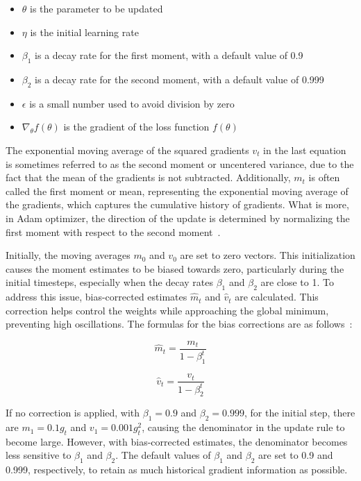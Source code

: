 \documentclass[12pt,a4paper]{report}
\begin{document}
\begin{itemize}
  \item \(\theta\) is the parameter to be updated
  \item \(\eta\) is the initial learning rate
  \item \(\beta_1\) is a decay rate for the first moment, with a default value of 0.9
  \item \(\beta_2\) is a decay rate for the second moment, with a default value of 0.999
  \item \(\epsilon\) is a small number used to avoid division by zero
  \item \(\nabla_\theta f(\theta)\) is the gradient of the loss function \(f(\theta)\)
\end{itemize}

The exponential moving average of the squared gradients \( v_t \) in the last equation is sometimes referred to as the second moment or uncentered variance, due to the fact that the mean of the gradients is not subtracted. Additionally, \( m_t \) is often called the first moment or mean, representing the exponential moving average of the gradients, which captures the cumulative history of gradients. What is more, in Adam optimizer, the direction of the update is determined by normalizing the first moment with respect to the second moment~\cite{adamoptimizerw}.

Initially, the moving averages \( m_0 \) and \( v_0 \) are set to zero vectors. This initialization causes the moment estimates to be biased towards zero, particularly during the initial timesteps, especially when the decay rates \( \beta_1 \) and \( \beta_2 \) are close to 1. To address this issue, bias-corrected estimates \( \hat{m}_t \) and \( \hat{v}_t \) are calculated. This correction helps control the weights while approaching the global minimum, preventing high oscillations. The formulas for the bias corrections are as follows~\cite{adamoptimizerw}:

\begin{equation}
  \hat{m}_t = \frac{m_t}{1 - \beta_1^t}
\end{equation}

\begin{equation}
  \hat{v}_t = \frac{v_t}{1 - \beta_2^t}
\end{equation}

If no correction is applied, with \(\beta_1 = 0.9\) and \(\beta_2 = 0.999\), for the initial step, there are \(m_1 = 0.1 g_t\) and \(v_1 = 0.001 g_t^2\), causing the denominator in the update rule to become large. However, with bias-corrected estimates, the denominator becomes less sensitive to \(\beta_1\) and \(\beta_2\). The default values of \(\beta_1\) and \(\beta_2\) are set to 0.9 and 0.999, respectively, to retain as much historical gradient information as possible.
\end{document}
